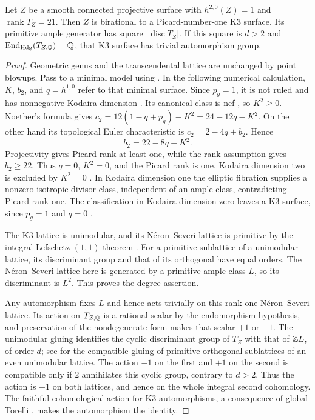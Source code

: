 \begin{lemma}\label{gw:k3-center}
Let $Z$ be a smooth connected projective surface with
$h^{2,0}(Z)=1$ and $\operatorname{rank}T_Z=21$.  Then $Z$ is birational to a
Picard-number-one K3 surface.  Its primitive ample generator has square
$|\operatorname{disc}T_Z|$.  If this square is $d>2$ and
$\operatorname{End}_{\mathrm{Hdg}}(T_{Z,\mathbb Q})=\mathbb Q$, that K3 surface has
trivial automorphism group.
\end{lemma}
\begin{proof}
Geometric genus and the transcendental lattice are unchanged by point
blowups. Pass to a minimal model using \cite[Proposition~II.16]{Beauville78}.
In the following numerical calculation, $K$, $b_2$, and $q=h^{1,0}$
refer to that minimal surface.
Since $p_g=1$, it is not ruled and has nonnegative Kodaira dimension
\cite[Propositions~III.20--III.21 and Example~VII.3]{Beauville78}. Its canonical class is nef
\cite[Corollary~VI.18]{Beauville78}, so $K^2\geq0$.
Noether's formula \cite[Sections~I.14 and~III.19]{Beauville78} gives
$c_2=12(1-q+p_g)-K^2=24-12q-K^2$.
On the other hand its topological Euler characteristic is
$c_2=2-4q+b_2$.  Hence
\[
                     b_2=22-8q-K^2.
\]
Projectivity gives Picard rank at least one, while the rank assumption gives
$b_2\geq22$.  Thus $q=0$, $K^2=0$, and the Picard rank is one.
Kodaira dimension two is excluded by $K^2=0$ \cite[Proposition~X.1]{Beauville78}.  In Kodaira dimension one the
elliptic fibration \cite[Proposition~IX.2]{Beauville78} supplies a
nonzero isotropic divisor class, independent
of an ample class, contradicting Picard rank one.  The classification in
Kodaira dimension zero leaves a K3 surface, since $p_g=1$ and $q=0$
\cite[Theorem~VIII.2]{Beauville78}.

The K3 lattice is unimodular, and its N\'eron--Severi lattice is primitive
by the integral Lefschetz $(1,1)$ theorem
\cite[Theorem~2]{VoisinHodge2016}.
For a primitive sublattice of a unimodular lattice, its discriminant group
and that of its orthogonal have equal orders.  The N\'eron--Severi lattice
here is generated by a primitive ample class $L$, so its discriminant is
$L^2$.  This proves the degree assertion.

Any automorphism fixes $L$ and hence acts trivially on this rank-one
N\'eron--Severi lattice.  Its action on $T_{Z,\mathbb Q}$ is a rational scalar by
the endomorphism hypothesis, and preservation of the nondegenerate form
makes that scalar $+1$ or $-1$.  The unimodular gluing identifies the
cyclic discriminant group of $T_Z$ with that of $\mathbb Z L$, of order $d$;
see \cite[Proposition~1.6.1]{Nikulin80} for the compatible gluing of
primitive orthogonal sublattices of an even unimodular lattice.
The action $-1$ on the first and $+1$ on the second is compatible only if
$2$ annihilates this cyclic group, contrary to $d>2$.  Thus the action is
$+1$ on both lattices, and hence on the whole integral second cohomology.
The faithful cohomological action for K3 automorphisms, a consequence of
global Torelli \cite[Proposition~15.2.1]{Huybrechts16}, makes the
automorphism the identity.
\end{proof}

